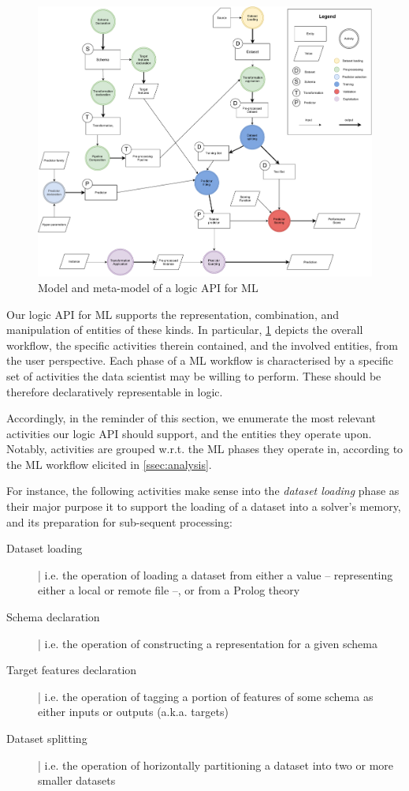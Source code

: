 \documentclass[12pt,a4paper,openright,twoside]{book}
\begin{document}
\begin{figure}
    \centering
    \includegraphics[width=\linewidth]{figures/phases2.pdf}
    \caption{Model and meta-model of a logic API for ML}
    \label{fig:fasi2}
\end{figure}

Our logic API for ML supports the representation, combination, and manipulation of entities of these kinds.
%
In particular, \cref{fig:fasi2} depicts the overall workflow, the specific activities therein contained, and the involved entities, from the user perspective.
%
Each phase of a ML workflow is characterised by a specific set of activities the data scientist may be willing to perform.
%
These should be therefore declaratively representable in logic.

Accordingly, in the reminder of this section, we enumerate the most relevant activities our logic API should support, and the entities they operate upon.
%
Notably, activities are grouped w.r.t. the ML phases they operate in, according to the ML workflow elicited in \cref{ssec:analysis}.

For instance, the following activities make sense into the \emph{dataset loading} phase as their major purpose it to support the loading of a dataset into a solver's memory, and its preparation for sub-sequent processing:
%
\begin{description}
    \item[Dataset loading] | i.e. the operation of loading a dataset from either a value -- representing either a local or remote file --, or from a Prolog theory
    \item[Schema declaration] | i.e. the operation of constructing a representation for a given schema
    \item[Target features declaration] | i.e. the operation of tagging a portion of features of some schema as either inputs or outputs (a.k.a. targets)
    \item[Dataset splitting] | i.e. the operation of horizontally partitioning a dataset into two or more smaller datasets
\end{description}
\end{document}
